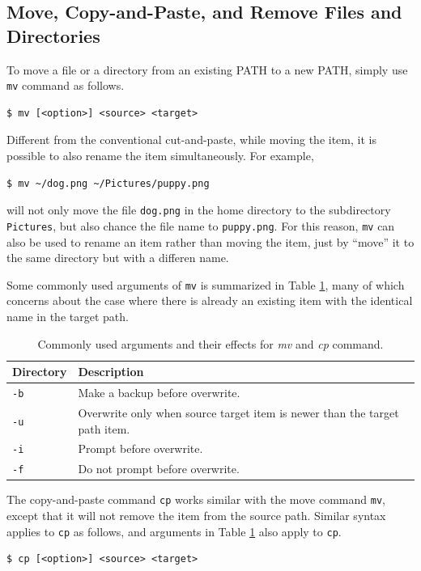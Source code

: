 \subsection{Move, Copy-and-Paste, and Remove Files and Directories}

To move a file or a directory from an existing PATH to a new PATH, simply use \verb|mv| command as follows.
\begin{lstlisting}
$ mv [<option>] <source> <target>
\end{lstlisting}
Different from the conventional cut-and-paste, while moving the item, it is possible to also rename the item simultaneously. For example,
\begin{lstlisting}
$ mv ~/dog.png ~/Pictures/puppy.png
\end{lstlisting}
will not only move the file \verb|dog.png| in the home directory to the subdirectory \verb|Pictures|, but also chance the file name to \verb|puppy.png|. For this reason, \verb|mv| can also be used to rename an item rather than moving the item, just by ``move'' it to the same directory but with a differen name.

Some commonly used arguments of \verb|mv| is summarized in Table \ref{ch:fm:tab:mvcpcommandargument}, many of which concerns about the case where there is already an existing item with the identical name in the target path.

\begin{table}
  \centering \caption{Commonly used arguments and their effects for \textit{mv} and \textit{cp} command.}\label{ch:fm:tab:mvcpcommandargument}
  \begin{tabularx}{\textwidth}{lX}
    \hline
    Directory & Description \\ \hline
    \verb|-b| & Make a backup before overwrite. \\ \hdashline
    \verb|-u| & Overwrite only when source target item is newer than the target path item. \\ \hdashline
    \verb|-i| & Prompt before overwrite. \\ \hdashline
    \verb|-f| & Do not prompt before overwrite. \\
    \hline
  \end{tabularx}
\end{table}

The copy-and-paste command \verb|cp| works similar with the move command \verb|mv|, except that it will not remove the item from the source path. Similar syntax applies to \verb|cp| as follows, and arguments in Table \ref{ch:fm:tab:mvcpcommandargument} also apply to \verb|cp|.
\begin{lstlisting}
$ cp [<option>] <source> <target>
\end{lstlisting}

